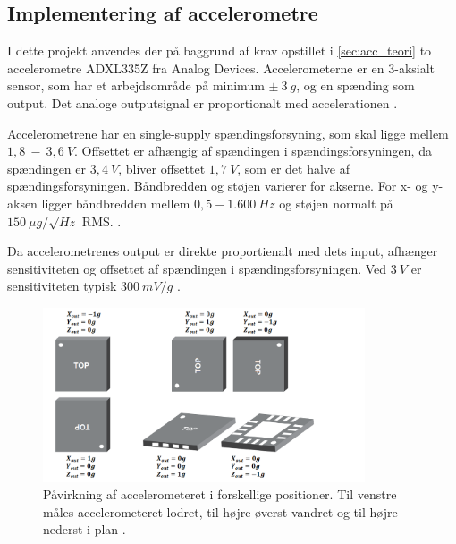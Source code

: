 \subsection{Implementering af accelerometre}

I dette projekt anvendes der på baggrund af krav opstillet i \autoref{sec:acc_teori} to accelerometre ADXL335Z fra Analog Devices. Accelerometerne er en 3-aksialt sensor, som har et arbejdsområde på minimum $\pm~3~g$, og en spænding som output. Det analoge outputsignal er proportionalt med accelerationen \citep{analogdevices2009}. 

\noindent
Accelerometrene har en single-supply spændingsforsyning, som skal ligge mellem $1,8~-~3,6~V$.  Offsettet er afhængig af spændingen i spændingsforsyningen, da spændingen er $3,4~V$, bliver offsettet $1,7~V$, som er det halve af spændingsforsyningen. Båndbredden og støjen varierer for akserne. For x- og y-aksen ligger båndbredden mellem $0,5 - 1.600~Hz$ og støjen normalt på $150~\mu g/\sqrt{Hz}$ RMS.  \citep{analogdevices2010}. %

Da accelerometrenes output er direkte proportienalt med dets input, afhænger sensitiviteten og offsettet af spændingen i spændingsforsyningen. Ved $3~V$ er sensitiviteten typisk $300~mV/g$ \citep{analogdevices2010}. 


\begin{figure}[H]
\centering
\includegraphics[width=0.85\textwidth]{figures/acc_paavirkning}
\caption{Påvirkning af accelerometeret i forskellige positioner. Til venstre måles accelerometeret lodret, til højre øverst vandret og til højre nederst i plan \citep{analogdevices2010}.}
\label{fig:acc}
\end{figure}

